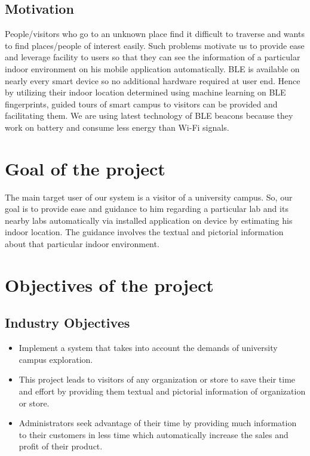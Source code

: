 \documentclass{article}
\begin{document}
\subsection{Motivation}
People/visitors who go to an unknown place find it difficult to traverse and wants to find places/people of interest easily. Such problems motivate us to provide ease and leverage facility to users so that they can see the information of a particular indoor environment on his mobile application automatically. BLE is available on nearly every smart device so no additional hardware required at user end. Hence by utilizing their indoor location determined using machine learning on BLE fingerprints, guided tours of smart campus to visitors can be provided and facilitating them. We are using latest technology of BLE beacons because they work on battery and consume less energy than Wi-Fi signals\cite{hultgren2015evaluating}.
\section{Goal of the project}
The main target user of our system is a visitor of a university campus. So, our goal is to provide ease and guidance to him regarding a particular lab and its nearby labs automatically via installed application on device by estimating his indoor location. The guidance involves the textual and pictorial information about that particular indoor environment.
\section{Objectives of the project}
\subsection{Industry Objectives}
\begin{itemize}
\item Implement a system that takes into account the demands of university campus exploration.
\item This project leads to visitors of any organization or store to save their time and effort by providing them textual and pictorial information of organization or store.
\item Administrators seek advantage of their time by providing much information to their customers in less time which automatically increase the sales and profit of their product.

\end{itemize}
\end{document}
